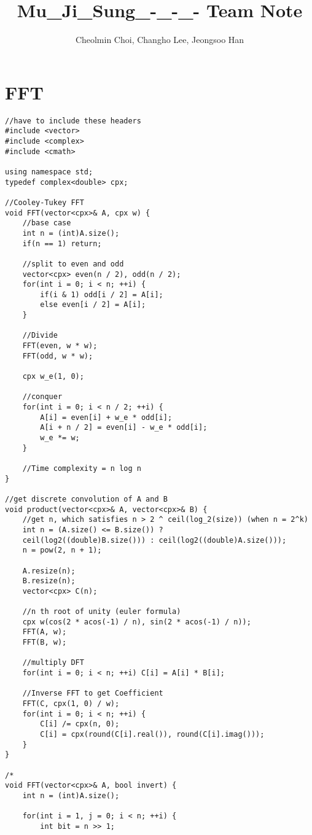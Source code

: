 \documentclass[landscape, 8pt, a4paper, oneside, twocolumn]{extarticle}
\title{Mu\_Ji\_Sung\_-\_-\_- Team Note}
\author{Cheolmin Choi, Changho Lee, Jeongsoo Han}
\begin{document}
\maketitle

\section{FFT}

\begin{verbatim}
//have to include these headers
#include <vector>
#include <complex>
#include <cmath>

using namespace std;
typedef complex<double> cpx;

//Cooley-Tukey FFT
void FFT(vector<cpx>& A, cpx w) {
    //base case
    int n = (int)A.size();
    if(n == 1) return;

    //split to even and odd
    vector<cpx> even(n / 2), odd(n / 2);
    for(int i = 0; i < n; ++i) {
        if(i & 1) odd[i / 2] = A[i];
        else even[i / 2] = A[i];
    }

    //Divide
    FFT(even, w * w);
    FFT(odd, w * w);

    cpx w_e(1, 0);

    //conquer
    for(int i = 0; i < n / 2; ++i) {
        A[i] = even[i] + w_e * odd[i];
        A[i + n / 2] = even[i] - w_e * odd[i];
        w_e *= w;
    }

    //Time complexity = n log n
}

//get discrete convolution of A and B
void product(vector<cpx>& A, vector<cpx>& B) {
    //get n, which satisfies n > 2 ^ ceil(log_2(size)) (when n = 2^k)
    int n = (A.size() <= B.size()) ? 
    ceil(log2((double)B.size())) : ceil(log2((double)A.size()));
    n = pow(2, n + 1);

    A.resize(n);
    B.resize(n);
    vector<cpx> C(n);

    //n th root of unity (euler formula)
    cpx w(cos(2 * acos(-1) / n), sin(2 * acos(-1) / n));
    FFT(A, w);
    FFT(B, w);

    //multiply DFT
    for(int i = 0; i < n; ++i) C[i] = A[i] * B[i];

    //Inverse FFT to get Coefficient
    FFT(C, cpx(1, 0) / w);
    for(int i = 0; i < n; ++i) {
        C[i] /= cpx(n, 0);
        C[i] = cpx(round(C[i].real()), round(C[i].imag()));
    }
}

/*
void FFT(vector<cpx>& A, bool invert) {
    int n = (int)A.size();

    for(int i = 1, j = 0; i < n; ++i) {
        int bit = n >> 1;


\end{verbatim}
\end{document}
